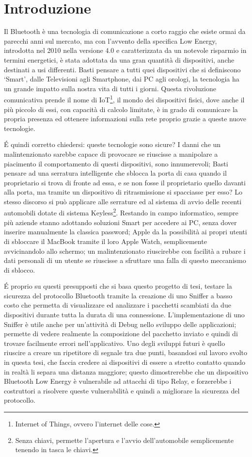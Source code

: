 
\section{Introduzione}
Il Bluetooth è una tecnologia di comunicazione a corto raggio che esiste ormai da parecchi anni sul mercato, ma con l'avvento della specifica Low Energy, introdotta nel 2010 nella versione 4.0 e caratterizzata da un notevole risparmio in termini energetici, è stata adottata da una gran quantità di dispositivi, anche destinati a usi differenti. Basti pensare a tutti quei dispositivi che si definiscono \lq Smart\rq, dalle Televisioni agli Smartphone, dai PC agli orologi, la tecnologia ha un grande impatto sulla nostra vita di tutti i giorni.
Questa rivoluzione comunicativa prende il nome di IoT\footnote{Internet of Things, ovvero l'internet delle cose.}, il mondo dei dispositivi fisici, dove anche il più piccolo di essi, con capacità di calcolo limitate, è in grado di comunicare la propria presenza ed ottenere informazioni sulla rete proprio grazie a queste nuove tecnologie.

\'E quindi corretto chiedersi: queste tecnologie sono sicure? I danni che un malintenzionato sarebbe capace di provocare se riuscisse a manipolare a piacimento il comportamento di questi dispositivi, sono innumerevoli;
Basti pensare ad una serratura intelligente che sblocca la porta di casa quando il proprietario si trova di fronte ad essa, e se non fosse il proprietario quello davanti alla porta, ma tramite un dispositivo di ritrasmissione si spacciasse per esso? Lo stesso discorso si può applicare alle serrature ed al sistema di avvio delle recenti automobili dotate di sistema Keyless\footnote{Senza chiavi, permette l'apertura e l'avvio dell'automobile semplicemente tenendo in tasca le chiavi.}.
Restando in campo informatico, sempre più aziende stanno adottando soluzioni Smart per accedere ai PC, senza dover inserire manualmente la classica password; Apple da la possibilità ai propri utenti di sbloccare il  MacBook tramite il loro Apple Watch, semplicemente avvicinandolo allo schermo; un malintenzionato riuscirebbe con facilità a rubare i dati personali di un utente se riuscisse a sfruttare una falla di questo meccanismo di sblocco.

\'E proprio su questi presupposti che si basa questo progetto di tesi, testare la sicurezza del protocollo Bluetooth tramite la creazione di uno Sniffer a basso costo che permetta di visualizzare ed analizzare i pacchetti scambiati da due dispositivi durante tutta la durata di una connessione. L'implementazione di uno Sniffer è utile anche per un'attività di Debug nello sviluppo delle applicazioni; permette di vedere realmente la composizione del pacchetto inviato e quindi di trovare facilmente errori nell'applicativo.
Uno degli sviluppi futuri è quello riuscire a creare un ripetitore di segnale tra due punti, basandosi sul lavoro svolto in questa tesi, che faccia credere ai dispositivi di essere a stretto contatto quando in realtà li separa una distanza maggiore; questo dimostrerebbe che un dispositivo Bluetooth Low Energy è vulnerabile ad attacchi di tipo Relay, e forzerebbe i costruttori a risolvere queste vulnerabilità e quindi a migliorare la sicurezza del protocollo.

